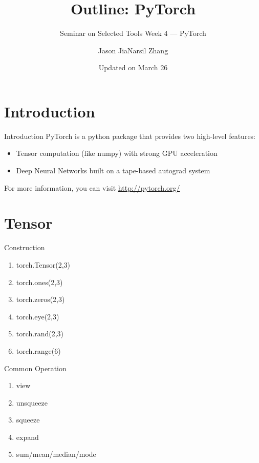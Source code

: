 \documentclass[english, nochinese]{../TeXTemplate/pkuslide}
\title{Outline: PyTorch}
\subtitle{Seminar on Selected Tools Week 4 --- PyTorch}
\author{Jason Jia\qquad Narsil Zhang}
\date{Updated on March 26}
\begin{document}
\begin{frame}
\titlepage
\end{frame}

\begin{frame}
\tableofcontents[subsectionstyle=show]
\end{frame}

\section{Introduction}

\begin{frame}
\sectionpage
\end{frame}

\begin{frame}{Introduction}
PyTorch is a python package that provides two high-level features:
\begin{itemize}
\item Tensor computation (like numpy) with strong GPU acceleration
\item Deep Neural Networks built on a tape-based autograd system
\end{itemize}
For more information, you can visit \url{http://pytorch.org/}
\end{frame}

\section{Tensor}

\begin{frame}
\sectionpage
\end{frame}

\begin{frame}{Construction}
\begin{enumerate}
    \item torch.Tensor(2,3)
    \item torch.ones(2,3)
    \item torch.zeros(2,3)
    \item torch.eye(2,3)
    \item torch.rand(2,3)
    \item torch.range(6)
\end{enumerate}
\end{frame}

\begin{frame}{Common Operation}
\begin{enumerate}
    \item view
	\item unsqueeze
	\item squeeze
	\item expand
	\item sum/mean/median/mode
\end{enumerate}
\end{frame}
\end{document}
